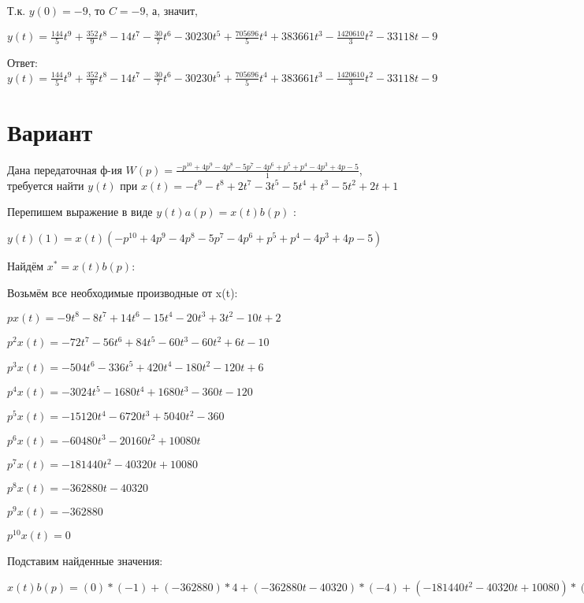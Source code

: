 \documentclass{article}
\begin{document}
Т.к. $y(0)=-9$, то $C=-9$, а, значит, 

$y(t)=\frac{144}{5}t^{9}+\frac{352}{9}t^{8}-14t^{7}-\frac{30}{7}t^{6}-30230t^{5}+\frac{705696}{5}t^{4}+383661t^{3}-\frac{1420610}{3}t^{2}-33118t-9$

Ответ: $y(t) = \frac{144}{5}t^{9}+\frac{352}{9}t^{8}-14t^{7}-\frac{30}{7}t^{6}-30230t^{5}+\frac{705696}{5}t^{4}+383661t^{3}-\frac{1420610}{3}t^{2}-33118t-9$

\section{Вариант}

Дана передаточная ф-ия $W(p)=\frac{-p^{10}+4p^{9}-4p^{8}-5p^{7}-4p^{6}+p^{5}+p^{4}-4p^{3}+4p-5}{1}$, требуется найти $y(t)$ при $x(t)=-t^{9}-t^{8}+2t^{7}-3t^{5}-5t^{4}+t^{3}-5t^{2}+2t+1$

Перепишем выражение в виде $y(t)a(p)=x(t)b(p)$ :

$y(t)(1)=x(t)(-p^{10}+4p^{9}-4p^{8}-5p^{7}-4p^{6}+p^{5}+p^{4}-4p^{3}+4p-5)$

Найдём $x^*=x(t)b(p)$:

Возьмём все необходимые производные от x(t):

$px(t)=-9t^{8}-8t^{7}+14t^{6}-15t^{4}-20t^{3}+3t^{2}-10t+2$

$p^2x(t)=-72t^{7}-56t^{6}+84t^{5}-60t^{3}-60t^{2}+6t-10$

$p^3x(t)=-504t^{6}-336t^{5}+420t^{4}-180t^{2}-120t+6$

$p^4x(t)=-3024t^{5}-1680t^{4}+1680t^{3}-360t-120$

$p^5x(t)=-15120t^{4}-6720t^{3}+5040t^{2}-360$

$p^6x(t)=-60480t^{3}-20160t^{2}+10080t$

$p^7x(t)=-181440t^{2}-40320t+10080$

$p^8x(t)=-362880t-40320$

$p^9x(t)=-362880$

$p^10x(t)=0$

Подставим найденные значения:

$x(t)b(p) = (0)*(-1)+(-362880)*4+(-362880t-40320)*(-4)+(-181440t^{2}-40320t+10080)*(-5)+(-60480t^{3}-20160t^{2}+10080t)*(-4)+(-15120t^{4}-6720t^{3}+5040t^{2}-360)*1+(-3024t^{5}-1680t^{4}+1680t^{3}-360t-120)*1+(-504t^{6}-336t^{5}+420t^{4}-180t^{2}-120t+6)*(-4)+(-9t^{8}-8t^{7}+14t^{6}-15t^{4}-20t^{3}+3t^{2}-10t+2)*4+(-9t^{8}-8t^{7}+14t^{6}-15t^{4}-20t^{3}+3t^{2}-10t+2)*(-5)=9t^{8}+8t^{7}+2002t^{6}-1680t^{5}-18465t^{4}+236900t^{3}+993597t^{2}+1612930t$
\end{document}
